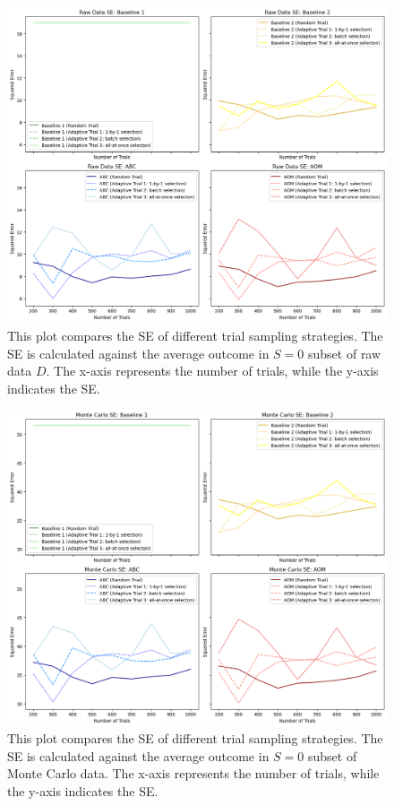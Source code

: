 \documentclass[12pt, oneside]{amsart}
\theoremstyle{definition}
\theoremstyle{remark}
\numberwithin{equation}{section}
\begin{document}
\begin{figure}[hbt!]
    \centering
    \includegraphics[scale=0.2]{Report/Figure/se_rct_raw.jpg}
    \caption{This plot compares the SE of different trial sampling strategies. The SE is calculated against the average outcome in $S=0$ subset of raw data $D$. The x-axis represents the number of trials, while the y-axis indicates the SE.}
    \label{se_rct_raw}
\end{figure}
\FloatBarrier

\begin{figure}[hbt!]
    \centering
    \includegraphics[scale=0.2]{Report/Figure/se_rct_mc.jpg}
    \caption{This plot compares the SE of different trial sampling strategies. The SE is calculated against the average outcome in $S=0$ subset of Monte Carlo data. The x-axis represents the number of trials, while the y-axis indicates the SE.}
    \label{se_rct_mc}
\end{figure}
\FloatBarrier
\end{document}
